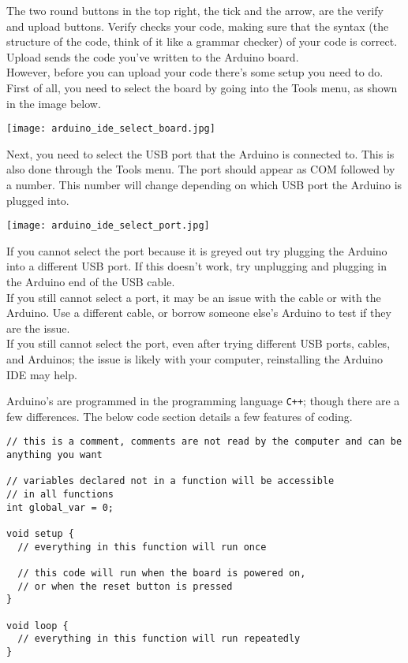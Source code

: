 \documentclass[../TinyBot.tex]{subfiles}
\begin{document}
The two round buttons in the top right, the tick and the arrow, are the verify and upload buttons. Verify checks your code, making sure that the syntax (the structure of the code, think of it like a grammar checker) of your code is correct. Upload sends the code you've written to the Arduino board.  \\

However, before you can upload your code there's some setup you need to do. First of all, you need to select the board by going into the Tools menu, as shown in the image below. 

\begin{center}
  \texttt{[image: arduino\_ide\_select\_board.jpg]}
\end{center}

Next, you need to select the USB port that the Arduino is connected to. This is also done through the Tools menu. The port should appear as COM followed by a number. This number will change depending on which USB port the Arduino is plugged into. 

\begin{center}
  \texttt{[image: arduino\_ide\_select\_port.jpg]}
\end{center}

\begin{notebox}
  If you cannot select the port because it is greyed out try plugging the Arduino into a different USB port. If this doesn't work, try unplugging and plugging in the Arduino end of the USB cable. \\

  If you still cannot select a port, it may be an issue with the cable or with the Arduino. Use a different cable, or borrow someone else's Arduino to test if they are the issue. \\

  If you still cannot select the port, even after trying different USB ports, cables, and Arduinos; the issue is likely with your computer, reinstalling the Arduino IDE may help. 
  
\end{notebox}


\bigskip

Arduino's are programmed in the programming language \lstinline[]!C++!; though there are a few differences. The below code section details a few features of coding.


\begin{lstlisting}
// this is a comment, comments are not read by the computer and can be anything you want

// variables declared not in a function will be accessible
// in all functions
int global_var = 0;

void setup {
  // everything in this function will run once

  // this code will run when the board is powered on,
  // or when the reset button is pressed
}

void loop {
  // everything in this function will run repeatedly
}

\end{lstlisting}
\bigskip
\end{document}

